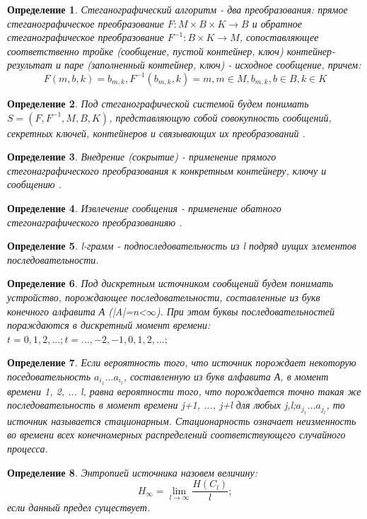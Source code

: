 \documentclass[a4paper,12pt]{article}
\theoremstyle{plain}
\newtheorem{definition}{Определение}[section]
\begin{document}
\begin{definition}\label{algoritm}
	Стеганографический алгоритм - два преобразования: прямое стеганографическое преобразование $F:M \times B \times K \to B$ и обратное стеганографическое преобразование $F^{-1}:B \times K \to M$, сопоставляющее соответственно тройке (сообщение, пустой контейнер, ключ) контейнер-результат и паре (заполненный контейнер, ключ) - исходное сообщение, \cite{agranovskiy}причем:
	\begin{equation}\label{algoritm equation}
		F(m, b, k) = b_{m,k}, F^{-1}(b_{m,k}, k) = m, m \in M, b_{m,k}, b \in B, k \in K
	\end{equation}
\end{definition}

\begin{definition}\label{stenography system}
	Под стеганографической системой будем понимать $S=(F, F^{-1}, M, B, K)$, представляющую собой совокупность сообщений, секретных ключей, контейнеров и связывающих их преобразований \cite{agranovskiy}.
\end{definition}

\begin{definition}\label{input}
	Внедрение (сокрытие) - применение прямого стегонаграфического преобразования к конкретным контейнеру, ключу и сообщению \cite{agranovskiy}.
\end{definition}

\begin{definition}\label{inside}
	Извлечение сообщения - применение обатного стегонаграфического преобразованияю \cite{agranovskiy}.
\end{definition}

\begin{definition}\label{l-gramm}
	l-грамм - подпоследовательность из l подряд иущих элементов последовательности.
\end{definition}

\begin{definition}
	Под дискретным источником сообщений будем понимать устройство, порождающее последовательности, составленные из букв конечного алфавита А (|A|=n<$\infty$). При этом буквы последовательностей пораждаются в дискретный момент времени:$ t = 0, 1, 2, ...; t = ...,-2, -1, 0, 1, 2, ...;$ \cite{duhin}
\end{definition}
\begin{definition}
	Если вероятность того, что источник порождает некоторую поседовательность $a_{i_1}...a_{i_l}$, составленную из букв алфавита А, в момент времени 1, 2, ... l, равна вероятности того, что порождается точно такая же последовательность в момент времени j+1, ..., j+l для любых j,l;$a_{j_1}...a_{j_l}$, то источник называется стационарным.\cite{duhin}
	Стационарность означает неизменность во времени всех конечномерных распределений соответствующего случайного процесса.
\end{definition}
\begin{definition}
	Энтропией источника назовем величину: 
	\begin{equation}
	H_\infty = \lim_{l \to \infty} \frac{H(C_l)}{l};
	 \end{equation}
	 если данный предел существует\cite{duhin}.
\end{definition}
 \clearpage
\end{document}
